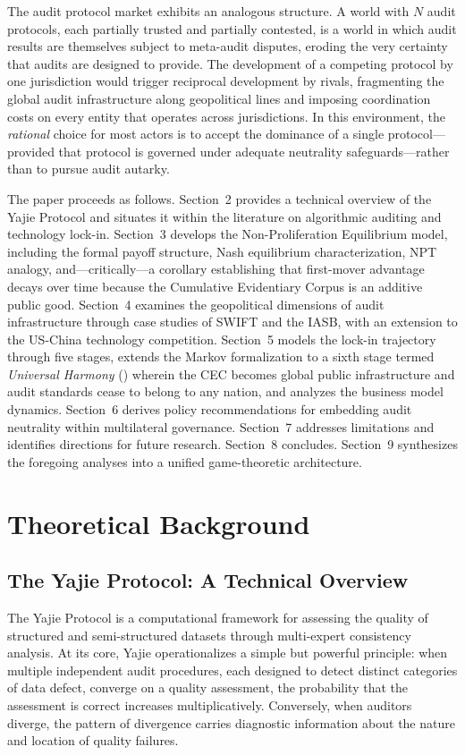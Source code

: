 \documentclass[12pt,a4paper]{article}
\theoremstyle{definition}
\theoremstyle{remark}
\begin{document}
The audit protocol market exhibits an analogous structure. A world with $N$ audit protocols, each partially trusted and partially contested, is a world in which audit results are themselves subject to meta-audit disputes, eroding the very certainty that audits are designed to provide. The development of a competing protocol by one jurisdiction would trigger reciprocal development by rivals, fragmenting the global audit infrastructure along geopolitical lines and imposing coordination costs on every entity that operates across jurisdictions. In this environment, the \textit{rational} choice for most actors is to accept the dominance of a single protocol—provided that protocol is governed under adequate neutrality safeguards—rather than to pursue audit autarky.

The paper proceeds as follows. Section~2 provides a technical overview of the Yajie Protocol and situates it within the literature on algorithmic auditing and technology lock-in. Section~3 develops the Non-Proliferation Equilibrium model, including the formal payoff structure, Nash equilibrium characterization, NPT analogy, and—critically—a corollary establishing that first-mover advantage decays over time because the Cumulative Evidentiary Corpus is an additive public good. Section~4 examines the geopolitical dimensions of audit infrastructure through case studies of SWIFT and the IASB, with an extension to the US-China technology competition. Section~5 models the lock-in trajectory through five stages, extends the Markov formalization to a sixth stage termed \textit{Universal Harmony} () wherein the CEC becomes global public infrastructure and audit standards cease to belong to any nation, and analyzes the business model dynamics. Section~6 derives policy recommendations for embedding audit neutrality within multilateral governance. Section~7 addresses limitations and identifies directions for future research. Section~8 concludes. Section~9 synthesizes the foregoing analyses into a unified game-theoretic architecture.

\section{Theoretical Background}

\subsection{The Yajie Protocol: A Technical Overview}

The Yajie Protocol is a computational framework for assessing the quality of structured and semi-structured datasets through multi-expert consistency analysis. At its core, Yajie operationalizes a simple but powerful principle: when multiple independent audit procedures, each designed to detect distinct categories of data defect, converge on a quality assessment, the probability that the assessment is correct increases multiplicatively. Conversely, when auditors diverge, the pattern of divergence carries diagnostic information about the nature and location of quality failures.
\end{document}
